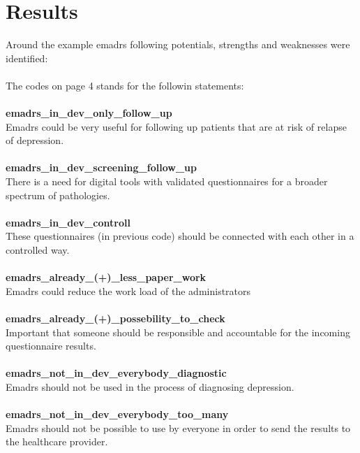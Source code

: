 \documentclass[12pt,a4paper,oneside]{article}
\begin{document}
\section*{Results}
Around the example e{madrs} following potentials, strengths and weaknesses were identified:\\\ \\
The codes on page 4 stands for the followin statements:\\\ \\
{\bf emadrs\_in\_dev\_only\_follow\_up}\\
E{\sc madrs} could be very useful for following up patients that are at risk of relapse of depression.\\\ \\
{\bf emadrs\_in\_dev\_screening\_follow\_up}\\
There is a need for digital tools with validated questionnaires for a broader spectrum of pathologies.\\\ \\
{\bf emadrs\_in\_dev\_controll}\\
These questionnaires (in previous code) should be connected with each other in a controlled way.\\\ \\
{\bf emadrs\_already\_(+)\_less\_paper\_work}\\
E{\sc madrs} could reduce the work load of the administrators\\\ \\
{\bf emadrs\_already\_(+)\_possebility\_to\_check}\\
Important that someone should be responsible and accountable for the incoming questionnaire results.\\\ \\
{\bf emadrs\_not\_in\_dev\_everybody\_diagnostic}\\
E{\sc madrs} should not be used in the process of diagnosing depression.\\\ \\
{\bf emadrs\_not\_in\_dev\_everybody\_too\_many}\\
E{\sc madrs} should not be possible to use by everyone in order to send the results to the healthcare provider.
\end{document}
